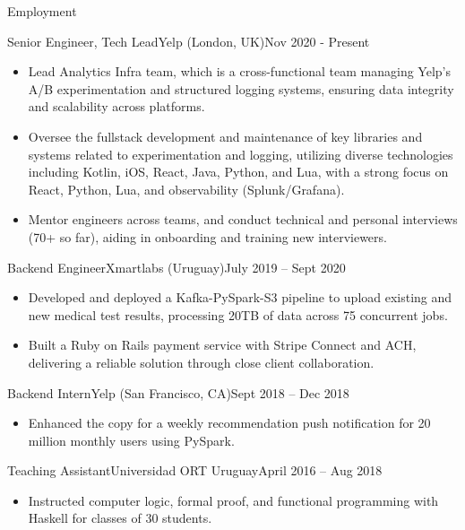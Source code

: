 \documentclass[]{mcdowellcv}
\begin{document}
	\makeheader
	
	\begin{cvsection}{Employment}
		\begin{cvsubsection}{Senior Engineer, Tech Lead}{Yelp (London, UK)}{Nov 2020 - Present}	
			\begin{itemize}
				\item Lead Analytics Infra team, which is a cross-functional team managing Yelp's A/B experimentation and structured logging systems, ensuring data integrity and scalability across platforms.
				\item Oversee the fullstack development and maintenance of key libraries and systems related to experimentation and logging, utilizing diverse technologies including Kotlin, iOS, React, Java, Python, and Lua, with a strong focus on React, Python, Lua, and observability (Splunk/Grafana).
				\item Mentor engineers across teams, and conduct technical and personal interviews (70+ so far), aiding in onboarding and training new interviewers.
			\end{itemize}
		\end{cvsubsection}
		
		
		\begin{cvsubsection}{Backend Engineer}{Xmartlabs (Uruguay)}{July 2019 -- Sept 2020}	
			\begin{itemize}
				\item Developed and deployed a Kafka-PySpark-S3 pipeline to upload existing and new medical test results, processing 20TB of data across 75 concurrent jobs.
				\item Built a Ruby on Rails payment service with Stripe Connect and ACH, delivering a reliable solution through close client collaboration.
			\end{itemize}
		\end{cvsubsection}
		
		\begin{cvsubsection}{Backend Intern}{Yelp (San Francisco, CA)}{Sept 2018 -- Dec 2018}		
			\begin{itemize}
				\item Enhanced the copy for a weekly recommendation push notification for 20 million monthly users using PySpark.
			\end{itemize}
		\end{cvsubsection}

		\begin{cvsubsection}{Teaching Assistant}{Universidad ORT Uruguay}{April 2016 -- Aug 2018}
			\begin{itemize}
				\item Instructed computer logic, formal proof, and functional programming with Haskell for classes of 30 students.
			\end{itemize}
		\end{cvsubsection}
	\end{cvsection}
	
\end{document}
